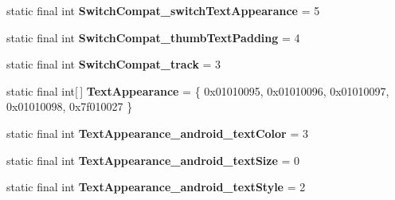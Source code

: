 \begin{DoxyCompactItemize}
\item 
\hypertarget{classandroid_1_1support_1_1v7_1_1appcompat_1_1_r_1_1styleable_a57a3f7e1a364acd3c1edf62eb9b9c16e}{}static final int {\bfseries Switch\+Compat\+\_\+switch\+Text\+Appearance} = 5\label{classandroid_1_1support_1_1v7_1_1appcompat_1_1_r_1_1styleable_a57a3f7e1a364acd3c1edf62eb9b9c16e}

\item 
\hypertarget{classandroid_1_1support_1_1v7_1_1appcompat_1_1_r_1_1styleable_a52784edfe08100afcff5bfe80a6fce81}{}static final int {\bfseries Switch\+Compat\+\_\+thumb\+Text\+Padding} = 4\label{classandroid_1_1support_1_1v7_1_1appcompat_1_1_r_1_1styleable_a52784edfe08100afcff5bfe80a6fce81}

\item 
\hypertarget{classandroid_1_1support_1_1v7_1_1appcompat_1_1_r_1_1styleable_a4a2d08a3045d8d919d6e643add8b6d8c}{}static final int {\bfseries Switch\+Compat\+\_\+track} = 3\label{classandroid_1_1support_1_1v7_1_1appcompat_1_1_r_1_1styleable_a4a2d08a3045d8d919d6e643add8b6d8c}

\item 
\hypertarget{classandroid_1_1support_1_1v7_1_1appcompat_1_1_r_1_1styleable_a85d64ca373dd3c60f50e0e9c1a55a8da}{}static final int\mbox{[}$\,$\mbox{]} {\bfseries Text\+Appearance} = \{ 0x01010095, 0x01010096, 0x01010097, 0x01010098, 0x7f010027 \}\label{classandroid_1_1support_1_1v7_1_1appcompat_1_1_r_1_1styleable_a85d64ca373dd3c60f50e0e9c1a55a8da}

\item 
\hypertarget{classandroid_1_1support_1_1v7_1_1appcompat_1_1_r_1_1styleable_ae130f82b90e33686295a03d11aa6c62f}{}static final int {\bfseries Text\+Appearance\+\_\+android\+\_\+text\+Color} = 3\label{classandroid_1_1support_1_1v7_1_1appcompat_1_1_r_1_1styleable_ae130f82b90e33686295a03d11aa6c62f}

\item 
\hypertarget{classandroid_1_1support_1_1v7_1_1appcompat_1_1_r_1_1styleable_af9f0bc5e4de5b5a13cf249d520135f6b}{}static final int {\bfseries Text\+Appearance\+\_\+android\+\_\+text\+Size} = 0\label{classandroid_1_1support_1_1v7_1_1appcompat_1_1_r_1_1styleable_af9f0bc5e4de5b5a13cf249d520135f6b}

\item 
\hypertarget{classandroid_1_1support_1_1v7_1_1appcompat_1_1_r_1_1styleable_aeacc55fa755882a9ea3f4afe39049916}{}static final int {\bfseries Text\+Appearance\+\_\+android\+\_\+text\+Style} = 2\label{classandroid_1_1support_1_1v7_1_1appcompat_1_1_r_1_1styleable_aeacc55fa755882a9ea3f4afe39049916}


\end{DoxyCompactItemize}
